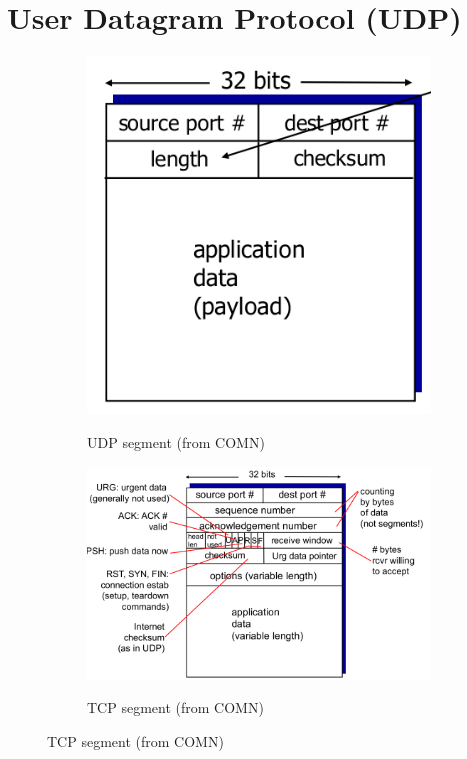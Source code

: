 \documentclass{article}
\begin{document}
\section{User Datagram Protocol (UDP)}
\begin{figure}
    \centering
    \begin{subfigure}{0.3\textwidth}
        \centering
        \includegraphics[width=\textwidth]{figures/udp.png}
        \label{fig:udp_header}
        \caption{UDP segment (from COMN)}
    \end{subfigure}
    \centering
    \begin{subfigure}{0.6\textwidth}
        \centering
        \includegraphics[width=\textwidth]{figures/tcp_header.png}
        \label{fig:tcp_header}
        \caption{TCP segment (from COMN)}
    \end{subfigure}
\end{figure}
\end{document}
